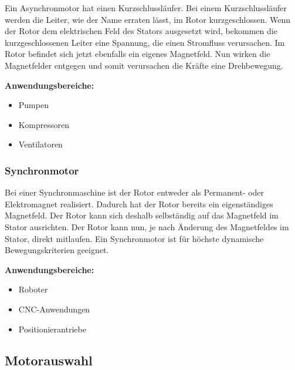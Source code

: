 Ein Asynchronmotor hat einen Kurzschlussläufer.
Bei einem Kurzschlussläufer werden die Leiter, wie der Name erraten lässt, im Rotor kurzgeschlossen. Wenn der Rotor dem elektrischen Feld des Stators ausgesetzt wird, bekommen die kurzgeschlossenen Leiter eine Spannung, die einen Stromfluss verursachen. Im Rotor befindet sich jetzt ebenfalls ein eigenes Magnetfeld. Nun wirken die Magnetfelder entgegen und somit verursachen die Kräfte eine Drehbewegung. 

\textbf{Anwendungsbereiche:}

\begin{itemize}
	\item{Pumpen}
	\item{Kompressoren}
	\item{Ventilatoren}
\end{itemize}

\subsubsection{Synchronmotor}
\label{sec:synchronmotor}

Bei einer Synchronmaschine ist der Rotor entweder als Permanent- oder Elektromagnet realisiert. Dadurch hat der Rotor bereits ein eigenständiges Magnetfeld. Der Rotor kann sich deshalb selbständig auf das Magnetfeld im Stator ausrichten. Der Rotor kann nun, je nach Änderung des Magnetfeldes im Stator, direkt mitlaufen. Ein Synchronmotor ist für höchste dynamische Bewegungskriterien geeignet. 

\textbf{Anwendungsbereiche:}

\begin{itemize}
	\item{Roboter}
	\item{CNC-Anwendungen}
	\item{Positionierantriebe}
\end{itemize}

\newpage

\subsection{Motorauswahl}
\label{sec:motorauswahl}

